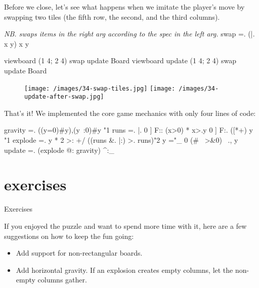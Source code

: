 \documentclass{article}
\begin{document}
Before we close, let's see what happens when we imitate the player's move by swapping two tiles (the fifth row, the second, and the third columns).

\begin{code}
   \emph{NB. swaps items in the right arg according to the spec in the left arg.}
   swap =. {{ (|. x { y) x } y }}

   viewboard (1 4; 2 4) swap update Board
   viewboard update (1 4; 2 4) swap update Board
\end{code}

\begin{figure}
\texttt{[image: /images/34-swap-tiles.jpg]}
\texttt{[image: /images/34-update-after-swap.jpg]}
\end{figure}

That's it!
We implemented the core game mechanics with only four lines of code:

\begin{code}[j]
gravity =. {{ ((y=0)#y),(y~:0)#y }}"1
runs    =. {{ |. 0 ] F:: {{ (x>0) * x>.y }} 0 ] F:. ([*+) y }}"1
explode =. {{ y * 2 >: +/ ((runs &. |:) >. runs)"2 y ="_ 0 (#~ >&0) ~., y }}
update  =. (explode @: gravity) ^:_
\end{code}

\section{exercises}{Exercises}

If you enjoyed the puzzle and want to spend more time with it,
here are a few suggestions on how to keep the fun going:

\begin{itemize}
\item Add support for non-rectangular boards.

\item Add horizontal gravity.
If an explosion creates empty columns, let the non-empty columns gather.
\end{itemize}
\end{document}
